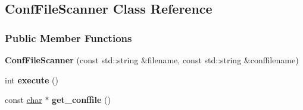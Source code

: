 \hypertarget{class_conf_file_scanner}{}\subsection{Conf\+File\+Scanner Class Reference}
\label{class_conf_file_scanner}
\subsubsection*{Public Member Functions}
\begin{DoxyCompactItemize}
\item 
\hypertarget{class_conf_file_scanner_aabc8f3237a1655cd6d4761f08b9a0a92}{}{\bfseries Conf\+File\+Scanner} (const std\+::string \&filename, const std\+::string \&conffilename)\label{class_conf_file_scanner_aabc8f3237a1655cd6d4761f08b9a0a92}

\item 
\hypertarget{class_conf_file_scanner_a87f36ac1ebe1c0613ab46a6f418cf4e8}{}int {\bfseries execute} ()\label{class_conf_file_scanner_a87f36ac1ebe1c0613ab46a6f418cf4e8}

\item 
\hypertarget{class_conf_file_scanner_a0845e3dfa7e2f9e2fde7e0c383e0f510}{}const \hyperlink{classchar}{char} $\ast$ {\bfseries get\+\_\+conffile} ()\label{class_conf_file_scanner_a0845e3dfa7e2f9e2fde7e0c383e0f510}

\end{DoxyCompactItemize}
